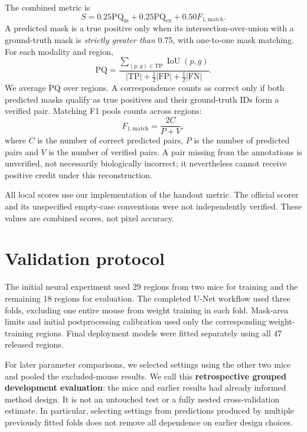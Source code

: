\documentclass[11pt]{article}
\newcommand{\PQ}{\mathrm{PQ}}
\newcommand{\Fone}{F_{1,\mathrm{match}}}
\begin{document}
The combined metric is
\begin{equation}
S=0.25\PQ_{\mathrm{in}}+0.25\PQ_{\mathrm{ex}}+0.50\Fone.
\end{equation}
A predicted mask is a true positive only when its intersection-over-union with a ground-truth mask is \emph{strictly greater than} 0.75, with one-to-one mask matching. For each modality and region,
\begin{equation}
\PQ=\frac{\sum_{(p,g)\in\mathrm{TP}}\operatorname{IoU}(p,g)}
{|\mathrm{TP}|+\frac12|\mathrm{FP}|+\frac12|\mathrm{FN}|}.
\end{equation}
We average PQ over regions. A correspondence counts as correct only if both predicted masks qualify as true positives and their ground-truth IDs form a verified pair. Matching F1 pools counts across regions:
\begin{equation}
\Fone=\frac{2C}{P+V},
\end{equation}
where $C$ is the number of correct predicted pairs, $P$ is the number of predicted pairs and $V$ is the number of verified pairs. A pair missing from the annotations is unverified, not necessarily biologically incorrect; it nevertheless cannot receive positive credit under this reconstruction.

All local scores use our implementation of the handout metric. The official scorer and its unspecified empty-case conventions were not independently verified. These values are combined scores, not pixel accuracy.

\section{Validation protocol}
The initial neural experiment used 29 regions from two mice for training and the remaining 18 regions for evaluation. The completed U-Net workflow used three folds, excluding one entire mouse from weight training in each fold. Mask-area limits and initial postprocessing calibration used only the corresponding weight-training regions. Final deployment models were fitted separately using all 47 released regions.

For later parameter comparisons, we selected settings using the other two mice and pooled the excluded-mouse results. We call this \textbf{retrospective grouped development evaluation}: the mice and earlier results had already informed method design. It is not an untouched test or a fully nested cross-validation estimate. In particular, selecting settings from predictions produced by multiple previously fitted folds does not remove all dependence on earlier design choices.
\end{document}
